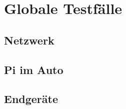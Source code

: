 \documentclass[pflichtenheft.tex]{subfiles}
\begin{document}
\chapter{Globale Testfälle}
\section{Netzwerk}
\section{Pi im Auto}
\section{Endgeräte}
\end{document}
